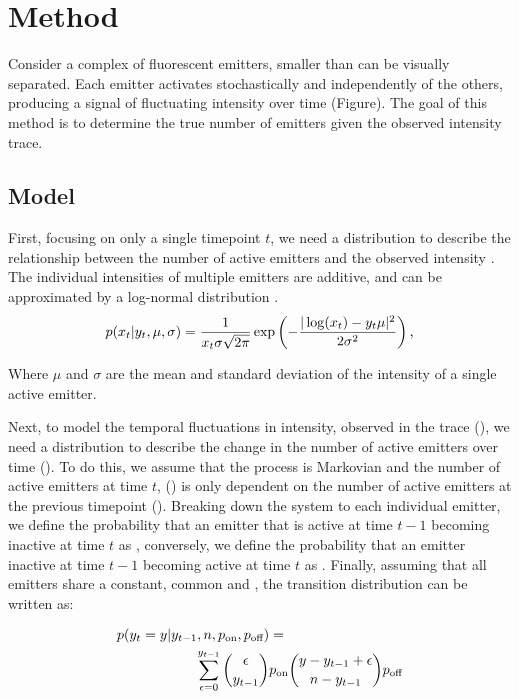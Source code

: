 \section{Method}

Consider a complex of fluorescent emitters, smaller than can be visually separated. Each emitter activates stochastically and independently of the others, producing a signal of fluctuating intensity over time (Figure).
The goal of this method is to determine the true number of emitters \truen given the observed intensity trace.

\subsection{Model}

First, focusing on only a single timepoint $t$, we need a distribution to describe the relationship between the number of active emitters  and the observed intensity . The individual intensities of multiple emitters are additive, and can be approximated by a log-normal distribution \cite{mutch_deconvolving_2007} \ie.
%
\begin{equation*}
  p(x_{t}|y_{t}, \mu, \sigma) =
    \frac{1}{x_{t}\sigma\sqrt{2\pi}}
    \exp \left(
      - \frac{|\log(x_{t}) - y_{t}\mu|^2}{2\sigma^2}
    \right)
  \text{,}
\end{equation*}

Where $\mu$ and $\sigma$ are the mean and standard deviation of the intensity of a single active emitter.

Next, to model the temporal fluctuations in intensity, observed in the trace (\trace), we need a distribution to describe the change in the number of active emitters over time (\states). To do this, we assume that the process is Markovian and the number of active emitters at time $t$, () is only dependent on the number of active emitters at the previous timepoint (). Breaking down the system to each individual emitter, we define the probability that an emitter that is active at time $t-1$ becoming inactive at time $t$ as \poff, conversely, we define the probability that an emitter inactive at time $t-1$ becoming active at time $t$ as \pon. Finally, assuming that all emitters share a constant, common \poff and \pon, the transition distribution can be written as:

\begin{align*}
  p(\y{t} = y | \y{t-1}, \n, \pon, \poff) &=\\
	\sum_{\epsilon = 0}^{\y{t-1}}
    {\epsilon \choose \y{t-1}}
    &\pon
    {y - \y{t-1} + \epsilon \choose \n - \y{t-1}}
    \poff
\end{align*}

